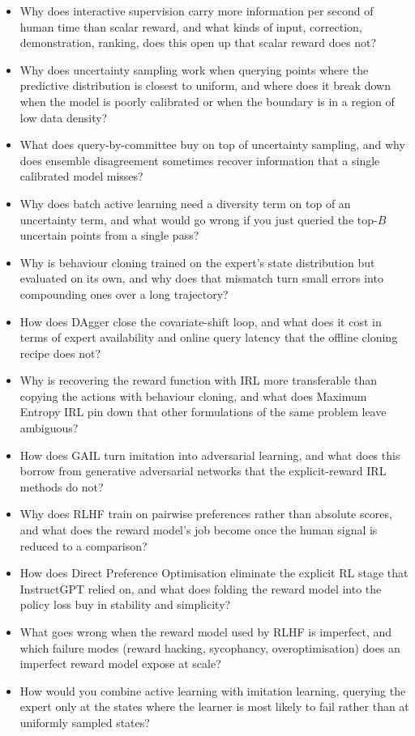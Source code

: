 \begin{itemize}
    \item Why does interactive supervision carry more information per second of human time than scalar reward, and what kinds of input, correction, demonstration, ranking, does this open up that scalar reward does not?
    \item Why does uncertainty sampling work when querying points where the predictive distribution is closest to uniform, and where does it break down when the model is poorly calibrated or when the boundary is in a region of low data density?
    \item What does query-by-committee buy on top of uncertainty sampling, and why does ensemble disagreement sometimes recover information that a single calibrated model misses?
    \item Why does batch active learning need a diversity term on top of an uncertainty term, and what would go wrong if you just queried the top-$B$ uncertain points from a single pass?
    \item Why is behaviour cloning trained on the expert's state distribution but evaluated on its own, and why does that mismatch turn small errors into compounding ones over a long trajectory?
    \item How does DAgger close the covariate-shift loop, and what does it cost in terms of expert availability and online query latency that the offline cloning recipe does not?
    \item Why is recovering the reward function with IRL more transferable than copying the actions with behaviour cloning, and what does Maximum Entropy IRL pin down that other formulations of the same problem leave ambiguous?
    \item How does GAIL turn imitation into adversarial learning, and what does this borrow from generative adversarial networks that the explicit-reward IRL methods do not?
    \item Why does RLHF train on pairwise preferences rather than absolute scores, and what does the reward model's job become once the human signal is reduced to a comparison?
    \item How does Direct Preference Optimisation eliminate the explicit RL stage that InstructGPT relied on, and what does folding the reward model into the policy loss buy in stability and simplicity?
    \item What goes wrong when the reward model used by RLHF is imperfect, and which failure modes (reward hacking, sycophancy, overoptimisation) does an imperfect reward model expose at scale?
    \item How would you combine active learning with imitation learning, querying the expert only at the states where the learner is most likely to fail rather than at uniformly sampled states?
\end{itemize}


